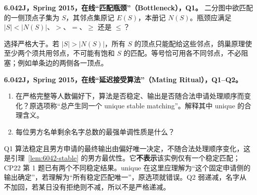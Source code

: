 \begin{exercise}\label{mit:6042-online-bottleneck-q1}
\textbf{6.042J，Spring 2015，在线“匹配瓶颈”（Bottleneck），Q1。}
二分图中欲匹配的一侧顶点子集为 $S$，其邻点集原记 $E(S)$，本册记 $N(S)$。瓶颈应满足 $|S|<|N(S)|$、$>$、$=$、$\ge$ 还是 $\le$？
\end{exercise}
\begin{solution}
选择严格大于。若 $|S|>|N(S)|$，所有 $S$ 的顶点只能配给这些邻点，鸽巢原理使至少两个须共用邻点，不可能有饱和 $S$ 的匹配。等号恰可用各不同邻点，不必阻塞；例如单条边的两侧各一顶点。
\end{solution}

\begin{exercise}
\textbf{6.042J，Spring 2015，在线“延迟接受算法”（Mating Ritual），Q1--Q2。}
\begin{enumerate}[label=Q\arabic*.]
\item\label{mit:6042-online-mating-ritual-q1} 在严格完整等人数偏好下，算法是否稳定、输出是否随合法申请处理顺序而变化？原选项称“总产生同一个 unique stable matching”。解释其中 unique 的合理含义。
\item\label{mit:6042-online-mating-ritual-q2} 每位男方名单剩余名字总数的最强单调性质是什么？
\end{enumerate}
\end{exercise}
\begin{solution}
Q1 算法稳定且男方申请的最终输出由偏好唯一决定，不随合法处理顺序变化，这是引理~\ref{lem:6042-stable} 的男方最优性。它\textbf{不表示}该实例仅有一个稳定匹配；CP22 第 1 题已有两个不同稳定结果。unique 在这里应理解为“这个固定申请侧的输出确定”，若理解为“所有稳定匹配唯一”，原选项就错误。Q2 弱递减，名字从不加回，若某日没有拒绝则不减，所以不是严格递减。
\end{solution}


